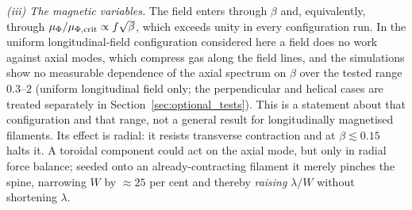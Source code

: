 \documentclass[usenatbib,twoside,twocolumn]{mnras}
\begin{document}
\emph{(iii) The magnetic variables.} The field enters through $\beta$ and, equivalently, through $\mu_\Phi/\mu_{\Phi,\rm crit}\propto f\sqrt{\beta}$, which exceeds unity in every configuration run. In the uniform longitudinal-field configuration considered here a field does no work against axial modes, which compress gas along the field lines, and the simulations show no measurable dependence of the axial spectrum on $\beta$ over the tested range $0.3$--$2$ (uniform longitudinal field only; the perpendicular and helical cases are treated separately in Section~\ref{sec:optional_tests}). This is a statement about that configuration and that range, not a general result for longitudinally magnetised filaments. Its effect is radial: it resists transverse contraction and at $\beta\lesssim0.15$ halts it. A toroidal component could act on the axial mode, but only in radial force balance; seeded onto an already-contracting filament it merely pinches the spine, narrowing $W$ by $\approx25$ per cent and thereby \emph{raising} $\lambda/W$ without shortening $\lambda$.
\end{document}
